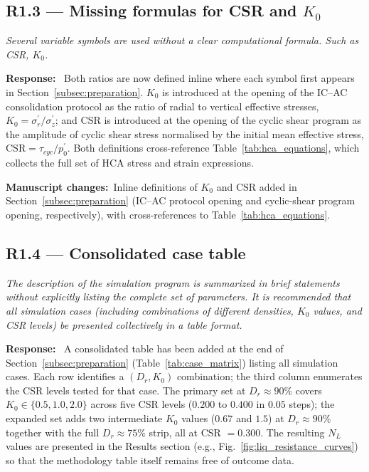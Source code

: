 \documentclass[11pt,a4paper]{article}
\newenvironment{rcomment}
  {\begin{leftbar}\color{black!75}\itshape}
  {\end{leftbar}\vspace{0.3em}}
\newcommand{\response}{\par\noindent\textbf{Response:}\ \ignorespaces}
\newcommand{\changed}[1]{\par\noindent\textbf{Manuscript changes:}\ #1\par}
\newcommand{\Kzero}{\ensuremath{K_0}}
\begin{document}
\subsection*{R1.3 --- Missing formulas for CSR and $\Kzero$}

\begin{rcomment}
Several variable symbols are used without a clear computational formula.
Such as CSR, $\Kzero$.
\end{rcomment}

\response
Both ratios are now defined inline where each symbol first appears
in Section~\ref{subsec:preparation}. $\Kzero$ is introduced at the
opening of the IC--AC consolidation protocol as the ratio of radial
to vertical effective stresses,
$\Kzero = \sigma_r^{\prime}/\sigma_z^{\prime}$; and CSR is introduced
at the opening of the cyclic shear program as the amplitude of
cyclic shear stress normalised by the initial mean effective stress,
$\mathrm{CSR} = \tau_{cyc}/p_0^{\prime}$. Both definitions
cross-reference Table~\ref{tab:hca_equations}, which collects the
full set of HCA stress and strain expressions.

\changed{Inline definitions of $\Kzero$ and $\mathrm{CSR}$ added in
Section~\ref{subsec:preparation} (IC--AC protocol opening and
cyclic-shear program opening, respectively), with cross-references
to Table~\ref{tab:hca_equations}.}

\subsection*{R1.4 --- Consolidated case table}

\begin{rcomment}
The description of the simulation program is summarized in brief statements
without explicitly listing the complete set of parameters. It is recommended
that all simulation cases (including combinations of different densities,
$\Kzero$ values, and CSR levels) be presented collectively in a table
format.
\end{rcomment}

\response
A consolidated table has been added at the end of
Section~\ref{subsec:preparation} (Table~\ref{tab:case_matrix})
listing all simulation cases. Each row identifies a
$(D_r, \Kzero)$ combination; the third column enumerates the CSR
levels tested for that case. The primary set at $D_r \approx 90\%$
covers $\Kzero \in \{0.5, 1.0, 2.0\}$ across five CSR levels
($0.200$ to $0.400$ in $0.05$ steps); the expanded set adds two
intermediate $\Kzero$ values ($0.67$ and $1.5$) at $D_r \approx
90\%$ together with the full $D_r \approx 75\%$ strip, all at
CSR $= 0.300$. The resulting $N_L$ values are presented in the
Results section (e.g., Fig.~\ref{fig:liq_resistance_curves}) so
that the methodology table itself remains free of outcome data.
\end{document}
